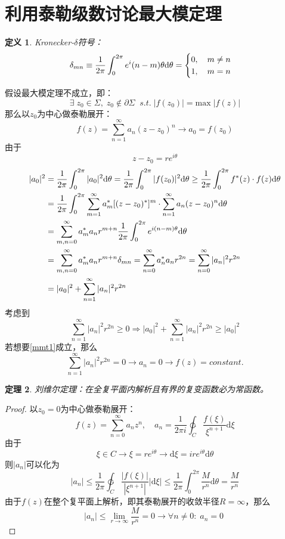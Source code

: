 \documentclass[10pt, a4paper, oneside]{ctexbook}
\newtheorem{theorem}{定理}[section]
\newtheorem{definition}[theorem]{定义}
\def\D{\mathrm{d}}
\newcommand{\F}[1][z]
{\ensuremath{f(#1)}}
\begin{document}
\section{利用泰勒级数讨论最大模定理}
\begin{definition}
    Kronecker-$\delta$符号：
    \begin{equation}
        \delta_{mn}\equiv\frac{1}{2\pi}\int_0^{2\pi}e^i(n-m)\theta \D \theta=\begin{aligned}
            \notag
            \begin{cases}
                0,\quad m\ne n \\ 1,\quad m=n
            \end{cases}
        \end{aligned}
    \end{equation}
\end{definition}
假设最大模定理不成立，即：$$
    \exists\;z_0\in\Sigma,\;z_0\notin \partial \Sigma\;\; s.t.\;|\F[z_0]|=\mathrm{max}\;|\F|
$$
那么以$z_0$为中心做泰勒展开：
$$
    \F=\sum_{n=1}^\infty a_n (z-z_0)^n\to a_0=\F[z_0]
$$
由于
$$
    z-z_0=re^{i\theta}
$$
\begin{align}
    |a_0|^2 & =\frac{1}{2\pi} \int_{0}^{2\pi} |a_0|^2\D \theta=\frac{1}{2\pi}\int_0^{2\pi}|f(z_0)|^2 \D \theta\ge\frac{1}{2\pi}\int_0^{2\pi}f^*(z)\cdot f(z) \D \theta \notag \\ \notag
            & =\frac{1}{2\pi}\int_0^{2\pi}\sum_{m=1}^\infty a_m^* [(z-z_0)^*]^m\cdot \sum_{n=1}^\infty a_n (z-z_0)^n \D \theta                                                \\\notag
            & =\sum_{m,n=0}^\infty a^*_m a_n r^{m+n}\frac{1}{2\pi} \int_0^{2\pi} e^{i(n-m)\theta}\D \theta                                                                    \\\notag
            & =\sum_{m,n=0}^\infty a^*_m a_n r^{m+n}\delta_{mn}=\sum_{n=0}^\infty a^*_na_n r^{2n}=\sum_{n=0}^\infty |a_n|^2 r^{2n}                                            \\
            & =|a_0|^2+\sum_{n=1}^\infty |a_n|^2r^{2n} \label{mmt1}
\end{align}
考虑到
$$
    \sum_{n=1}^\infty |a_n|^2r^{2n}\ge 0 \Rightarrow |a_0|^2+\sum_{n=1}^\infty |a_n|^2r^{2n} \ge |a_0|^2
$$
若想要\ref{mmt1}成立，那么
$$
    \sum_{n=1}^\infty |a_n|^2r^{2n} =0 \to a_n = 0 \to \F = constant.
$$
\begin{theorem}
    刘维尔定理：在全复平面内解析且有界的复变函数必为常函数。
\end{theorem}
\begin{proof}
    以$z_0=0$为中心做泰勒展开：
    $$
        \F = \sum_{n=0}^\infty a_n z^n,\quad a_n=\frac{1}{2\pi i}\ointctrclockwise_C \frac{\F[\xi]}{\xi^{n+1}}\D \xi
    $$
    由于$$
        \xi \in C\to \xi = re^{i\theta}\to \D \xi = ire^{i\theta} \D \theta
    $$
    则$|a_n|$可以化为
    $$
        |a_n|\le \frac{1}{2\pi}\ointctrclockwise_C \frac{|\F[\xi]|}{|\xi^{n+1}|}|\D \xi| \le \frac{1}{2\pi}\int_0^{2\pi} \frac{M}{r^{n}}\D \theta = \frac{M}{r^n}
    $$
    由于$\F$在整个复平面上解析，即其泰勒展开的收敛半径$R=\infty$，那么
    $$
        |a_n|\le \lim_{r\to \infty} \frac{M}{r^n} = 0 \to  \forall n\ne 0:\;a_n=0\;
    $$
\end{proof}
\end{document}
